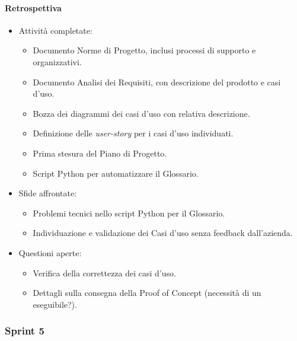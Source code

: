 \documentclass{article}
\begin{document}
                \paragraph{Retrospettiva}
                    \begin{itemize}
                        \item Attività completate:
                        \begin{itemize}
                            \item Documento Norme di Progetto, inclusi processi di supporto e organizzativi.
                            \item Documento Analisi dei Requisiti, con descrizione del prodotto e casi d'uso.
                            \item Bozza dei diagrammi dei casi d'uso con relativa descrizione.
                            \item Definizione delle \textit{user-story} per i casi d'uso individuati.
                            \item Prima stesura del Piano di Progetto.
                            \item Script Python per automatizzare il Glossario.
                        \end{itemize}
                        \item Sfide affrontate:
                        \begin{itemize}
                            \item Problemi tecnici nello script Python per il Glossario.
                            \item Individuazione e validazione dei Casi d'uso senza feedback dall'azienda.
                        \end{itemize}
                        \item Questioni aperte:
                        \begin{itemize}
                            \item Verifica della correttezza dei casi d'uso.
                            \item Dettagli sulla consegna della Proof of Concept (necessità di un eseguibile?).
                        \end{itemize}
                    \end{itemize}
            \subsubsection{Sprint 5}
\end{document}
